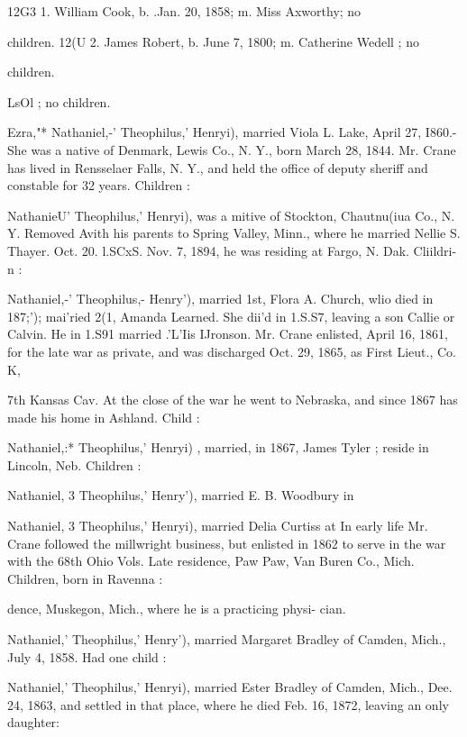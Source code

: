 \documentclass{book}
\begin{document}
12G3  1. William Cook, b. .Jan. 20, 1858; m. Miss Axworthy; no 

children. 
12(U 2. James Robert, b. June 7, 1800; m. Catherine Wedell ; no 

children. 

LsOl ; no children. 

Ezra,"* Nathaniel,-' Theophilus,' Henryi), married Viola L. Lake, 
April 27, I860.- She was a native of Denmark, Lewis Co., N. 
Y., born March 28, 1844. Mr. Crane has lived in Rensselaer 
Falls, N. Y., and held the office of deputy sheriff and constable 
for 32 years. Children : 


NathanieU' Theophilus,' Henryi), was a mitive of Stockton, 
Chautnu(iua Co., N. Y. Removed Avith his parents to Spring 
Valley, Minn., where he married Nellie S. Thayer. Oct. 20. l.SCxS. 
Nov. 7, 1894, he was residing at Fargo, N. Dak. Cliildri-n : 



Nathaniel,-' Theophilus,- Henry'), married 1st, Flora A. Church, 
wlio died in 187;'); mai'ried 2(1, Amanda Learned. She dii'd in 
1.S.S7, leaving a son Callie or Calvin. He in 1.S91 married .'L'Iis 
IJronson. Mr. Crane enlisted, April 16, 1861, for the late war as 
private, and was discharged Oct. 29, 1865, as First Lieut., Co. K, 




7th Kansas Cav. At the close of the war he went to Nebraska, 
and since 1867 has made his home in Ashland. Child : 

Nathaniel,:* Theophilus,' Henryi) , married, in 1867, James Tyler ; 
reside in Lincoln, Neb. Children : 





Nathaniel, 3 Theophilus,' Henry'), married E. B. Woodbury in 



Nathaniel, 3 Theophilus,' Henryi), married Delia Curtiss at 
In early life Mr. Crane followed the millwright business, but 
enlisted in 1862 to serve in the war with the 68th Ohio Vols. 
Late residence, Paw Paw, Van Buren Co., Mich. Children, born 
in Ravenna : 

dence, Muskegon, Mich., where he is a practicing physi- 
cian. 


Nathaniel,' Theophilus,' Henry'), married Margaret Bradley of 
Camden, Mich., July 4, 1858. Had one child : 


Nathaniel,' Theophilus,' Henryi), married Ester Bradley of 
Camden, Mich., Dee. 24, 1863, and settled in that place, where 
he died Feb. 16, 1872, leaving an only daughter: 
\end{document}
